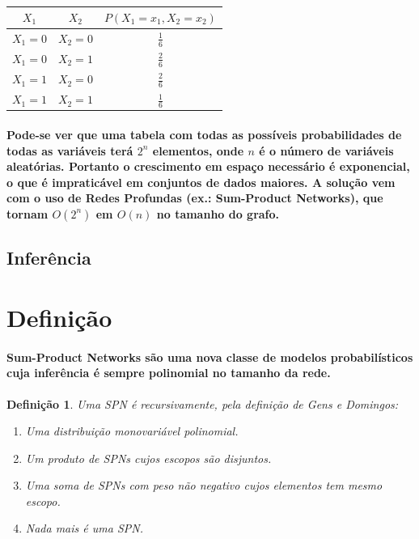 \documentclass[a4paper,10pt]{article}
\theoremstyle{plain}
\newtheorem*{spn-def}{Definição}
\begin{document}
\begin{table}[h*]
\caption{}
\begin{tabular}{*{3}{c}}
$X_1$ & $X_2$ & $P(X_1=x_1,X_2=x_2)$ \\
\hline
$X_1=0$ & $X_2=0$ & $\frac{1}{6}$ \\
$X_1=0$ & $X_2=1$ & $\frac{2}{6}$ \\
$X_1=1$ & $X_2=0$ & $\frac{2}{6}$ \\
$X_1=1$ & $X_2=1$ & $\frac{1}{6}$ \\
\end{tabular}
\end{table}

\paragraph{
  Pode-se ver que uma tabela com todas as possíveis probabilidades de todas as variáveis terá $2^n$ elementos, 
onde $n$ é o número de variáveis aleatórias. Portanto o crescimento em espaço necessário é exponencial, o que
é impraticável em conjuntos de dados maiores. A solução vem com o uso de Redes Profundas (ex.: Sum-Product Networks), 
que tornam $O(2^n)$ em $O(n)$ no tamanho do grafo.
}

\subsection{Inferência}



\section{Definição}

\paragraph{
  Sum-Product Networks são uma nova classe de modelos probabilísticos cuja inferência é sempre
polinomial no tamanho da rede.
}

\begin{spn-def} Uma SPN é recursivamente, pela definição de Gens e Domingos\cite{gens-domingos}:
\begin{enumerate} \itemsep0pt
  \item Uma distribuição monovariável polinomial.
  \item Um produto de SPNs cujos escopos são disjuntos.
  \item Uma soma de SPNs com peso não negativo cujos elementos tem mesmo escopo.
  \item Nada mais é uma SPN.
\end{enumerate}
\end{spn-def}
\end{document}
